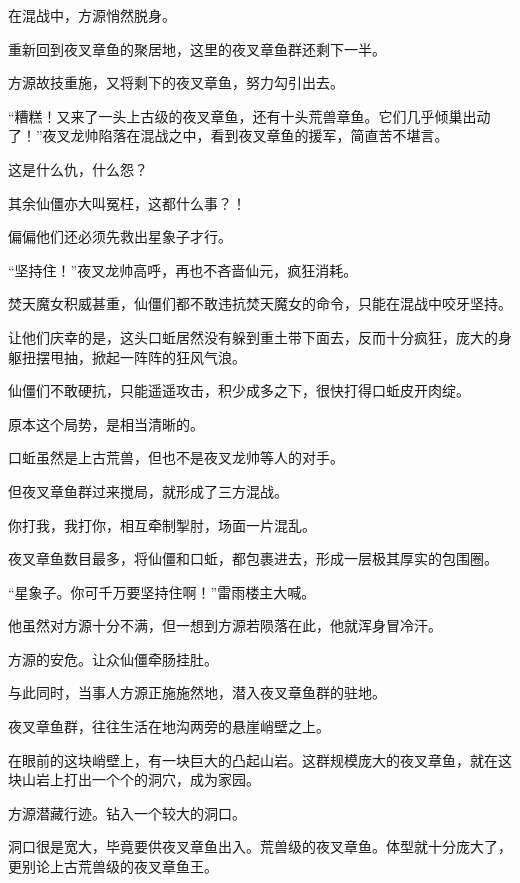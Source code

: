 
\begin{this_body}

在混战中，方源悄然脱身。

重新回到夜叉章鱼的聚居地，这里的夜叉章鱼群还剩下一半。

方源故技重施，又将剩下的夜叉章鱼，努力勾引出去。

“糟糕！又来了一头上古级的夜叉章鱼，还有十头荒兽章鱼。它们几乎倾巢出动了！”夜叉龙帅陷落在混战之中，看到夜叉章鱼的援军，简直苦不堪言。

这是什么仇，什么怨？

其余仙僵亦大叫冤枉，这都什么事？！

偏偏他们还必须先救出星象子才行。

“坚持住！”夜叉龙帅高呼，再也不吝啬仙元，疯狂消耗。

焚天魔女积威甚重，仙僵们都不敢违抗焚天魔女的命令，只能在混战中咬牙坚持。

让他们庆幸的是，这头口蚯居然没有躲到重土带下面去，反而十分疯狂，庞大的身躯扭摆甩抽，掀起一阵阵的狂风气浪。

仙僵们不敢硬抗，只能遥遥攻击，积少成多之下，很快打得口蚯皮开肉绽。

原本这个局势，是相当清晰的。

口蚯虽然是上古荒兽，但也不是夜叉龙帅等人的对手。

但夜叉章鱼群过来搅局，就形成了三方混战。

你打我，我打你，相互牵制掣肘，场面一片混乱。

夜叉章鱼数目最多，将仙僵和口蚯，都包裹进去，形成一层极其厚实的包围圈。

“星象子。你可千万要坚持住啊！”雷雨楼主大喊。

他虽然对方源十分不满，但一想到方源若陨落在此，他就浑身冒冷汗。

方源的安危。让众仙僵牵肠挂肚。

与此同时，当事人方源正施施然地，潜入夜叉章鱼群的驻地。

夜叉章鱼群，往往生活在地沟两旁的悬崖峭壁之上。

在眼前的这块峭壁上，有一块巨大的凸起山岩。这群规模庞大的夜叉章鱼，就在这块山岩上打出一个个的洞穴，成为家园。

方源潜藏行迹。钻入一个较大的洞口。

洞口很是宽大，毕竟要供夜叉章鱼出入。荒兽级的夜叉章鱼。体型就十分庞大了，更别论上古荒兽级的夜叉章鱼王。


\end{this_body}
